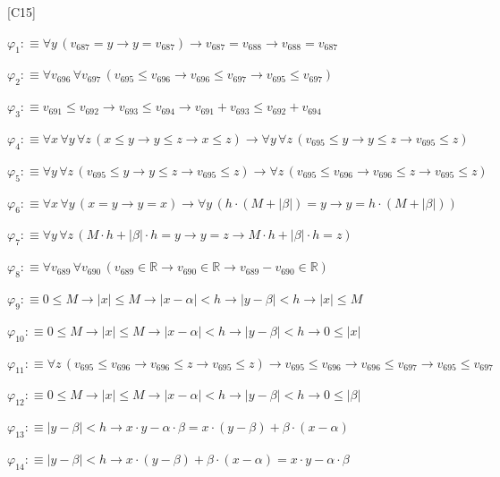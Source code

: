 \begin{fullproof}{[C15]}
\begin{abbrevlist}
\item $\varphi_{1} :\equiv \forall y\,(v_{687} = y \to y = v_{687}) \to v_{687} = v_{688} \to v_{688} = v_{687}$
\item $\varphi_{2} :\equiv \forall v_{696}\,\forall v_{697}\,(v_{695} \leq v_{696} \to v_{696} \leq v_{697} \to v_{695} \leq v_{697})$
\item $\varphi_{3} :\equiv v_{691} \leq v_{692} \to v_{693} \leq v_{694} \to v_{691} + v_{693} \leq v_{692} + v_{694}$
\item $\varphi_{4} :\equiv \forall x\,\forall y\,\forall z\,(x \leq y \to y \leq z \to x \leq z) \to \forall y\,\forall z\,(v_{695} \leq y \to y \leq z \to v_{695} \leq z)$
\item $\varphi_{5} :\equiv \forall y\,\forall z\,(v_{695} \leq y \to y \leq z \to v_{695} \leq z) \to \forall z\,(v_{695} \leq v_{696} \to v_{696} \leq z \to v_{695} \leq z)$
\item $\varphi_{6} :\equiv \forall x\,\forall y\,(x = y \to y = x) \to \forall y\,(h \cdot (M + \lvert \beta \rvert) = y \to y = h \cdot (M + \lvert \beta \rvert))$
\item $\varphi_{7} :\equiv \forall y\,\forall z\,(M \cdot h + \lvert \beta \rvert \cdot h = y \to y = z \to M \cdot h + \lvert \beta \rvert \cdot h = z)$
\item $\varphi_{8} :\equiv \forall v_{689}\,\forall v_{690}\,(v_{689} \in \mathbb{R} \to v_{690} \in \mathbb{R} \to v_{689} - v_{690} \in \mathbb{R})$
\item $\varphi_{9} :\equiv 0 \leq M \to \lvert x \rvert \leq M \to \lvert x - \alpha \rvert < h \to \lvert y - \beta \rvert < h \to \lvert x \rvert \leq M$
\item $\varphi_{10} :\equiv 0 \leq M \to \lvert x \rvert \leq M \to \lvert x - \alpha \rvert < h \to \lvert y - \beta \rvert < h \to 0 \leq \lvert x \rvert$
\item $\varphi_{11} :\equiv \forall z\,(v_{695} \leq v_{696} \to v_{696} \leq z \to v_{695} \leq z) \to v_{695} \leq v_{696} \to v_{696} \leq v_{697} \to v_{695} \leq v_{697}$
\item $\varphi_{12} :\equiv 0 \leq M \to \lvert x \rvert \leq M \to \lvert x - \alpha \rvert < h \to \lvert y - \beta \rvert < h \to 0 \leq \lvert \beta \rvert$
\item $\varphi_{13} :\equiv \lvert y - \beta \rvert < h \to x \cdot y - \alpha \cdot \beta = x \cdot (y - \beta) + \beta \cdot (x - \alpha)$
\item $\varphi_{14} :\equiv \lvert y - \beta \rvert < h \to x \cdot (y - \beta) + \beta \cdot (x - \alpha) = x \cdot y - \alpha \cdot \beta$

\end{abbrevlist}
\end{fullproof}
